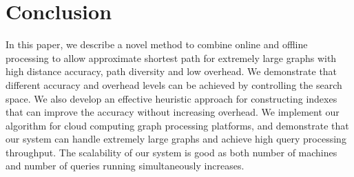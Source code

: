 \section{Conclusion}
\label{conclusion}

In this paper, we describe a novel method to combine online and offline processing to allow approximate shortest path for extremely large graphs with high distance accuracy, path diversity and low overhead. We demonstrate that different accuracy and overhead levels can be achieved by controlling the search space. We also develop an effective heuristic approach for constructing indexes that can improve the accuracy without increasing overhead. We implement our algorithm for cloud computing graph processing platforms, and demonstrate that our system can handle extremely large graphs and achieve high query processing throughput. The scalability of our system is good as both number of machines and number of queries running simultaneously increases. 
